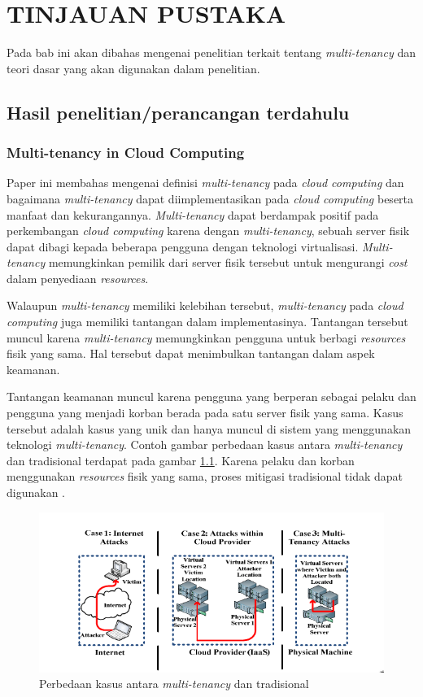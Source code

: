 \chapter{TINJAUAN PUSTAKA}

Pada bab ini akan dibahas mengenai penelitian terkait tentang \emph{multi-tenancy}
dan teori dasar yang akan digunakan dalam penelitian.

\section{Hasil penelitian/perancangan terdahulu}

\subsection{Multi-tenancy in Cloud Computing}

Paper ini membahas mengenai definisi \emph{multi-tenancy} pada \emph{cloud computing}
dan bagaimana \emph{multi-tenancy} dapat diimplementasikan pada \emph{cloud computing} beserta
manfaat dan kekurangannya. \emph{Multi-tenancy} dapat berdampak positif pada perkembangan
\emph{cloud computing} karena dengan \emph{multi-tenancy}, sebuah server fisik dapat
dibagi kepada beberapa pengguna dengan teknologi virtualisasi. \emph{Multi-tenancy} memungkinkan
pemilik dari server fisik tersebut untuk mengurangi \emph{cost} dalam penyediaan
\emph{resources}.

Walaupun \emph{multi-tenancy} memiliki kelebihan tersebut,
\emph{multi-tenancy} pada \emph{cloud computing} juga memiliki tantangan dalam
implementasinya. Tantangan tersebut muncul karena \emph{multi-tenancy} memungkinkan
pengguna untuk berbagi \emph{resources} fisik yang sama. Hal tersebut dapat menimbulkan
tantangan dalam aspek keamanan.

Tantangan keamanan muncul karena pengguna yang berperan sebagai pelaku dan pengguna
yang menjadi korban berada pada satu server fisik yang sama. Kasus tersebut adalah
kasus yang unik dan hanya muncul di sistem yang menggunakan teknologi \emph{multi-tenancy}.
Contoh gambar perbedaan kasus antara \emph{multi-tenancy} dan tradisional terdapat pada
gambar \ref{fig:MultiTenancyCase}. Karena pelaku dan korban menggunakan \emph{resources}
fisik yang sama, proses mitigasi tradisional tidak dapat digunakan \parencite{6830928}.

\begin{figure} [H] \centering
  \includegraphics[scale=0.6]{gambar/multi-tenancy-case.png}
  \caption{Perbedaan kasus antara \emph{multi-tenancy} dan tradisional}
  \label{fig:MultiTenancyCase}
\end{figure}

